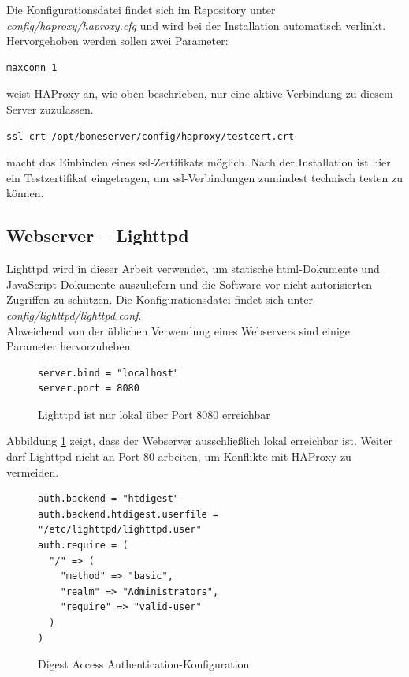 Die Konfigurationsdatei findet sich im Repository unter \textit{config/haproxy/haproxy.cfg} und wird bei der Installation automatisch verlinkt.
Hervorgehoben werden sollen zwei Parameter:

\begin{lstlisting}
maxconn 1
\end{lstlisting}
weist HAProxy an, wie oben beschrieben, nur eine aktive Verbindung zu diesem Server zuzulassen.

\begin{lstlisting}
ssl crt /opt/boneserver/config/haproxy/testcert.crt
\end{lstlisting}
macht das Einbinden eines \gls{ssl}-Zertifikats möglich. Nach der Installation ist hier ein Testzertifikat eingetragen, um \gls{ssl}-Verbindungen zumindest technisch testen zu können.


\subsection{Webserver -- Lighttpd}
\label{subsec:Lighttpd}
Lighttpd wird in dieser Arbeit verwendet, um statische \gls{html}-Dokumente und JavaScript-Dokumente auszuliefern und die Software vor nicht autorisierten Zugriffen zu schützen. Die Konfigurationsdatei findet sich unter \textit{config/lighttpd/lighttpd.conf}.\\

Abweichend von der üblichen Verwendung eines Webservers sind einige Parameter hervorzuheben.

\begin{figure}[ht]
\begin{lstlisting}
server.bind = "localhost"
server.port = 8080
\end{lstlisting}
\caption{Lighttpd ist nur lokal über Port 8080 erreichbar}
\label{lst:lighttpdLocal}
\end{figure}

Abbildung \ref{lst:lighttpdLocal} zeigt, dass der Webserver ausschließlich lokal erreichbar ist. Weiter darf Lighttpd nicht an Port 80 arbeiten, um Konflikte mit HAProxy zu vermeiden.\\

\begin{figure}[ht]
\begin{lstlisting}
auth.backend = "htdigest"
auth.backend.htdigest.userfile = "/etc/lighttpd/lighttpd.user"
auth.require = (
  "/" => (
    "method" => "basic",
    "realm" => "Administrators",
    "require" => "valid-user"
  )
)
\end{lstlisting}
\caption{Digest Access Authentication-Konfiguration}
\label{lst:lighttpdhtdigest}
\end{figure}

